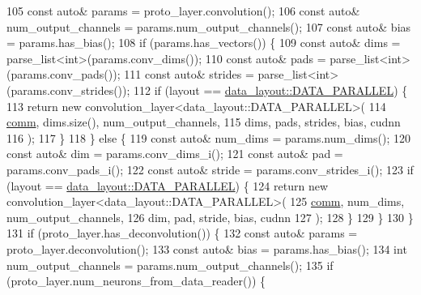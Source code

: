 \begin{DoxyCode}
105     \textcolor{keyword}{const} \textcolor{keyword}{auto}& params = proto\_layer.convolution();
106     \textcolor{keyword}{const} \textcolor{keyword}{auto}& num\_output\_channels = params.num\_output\_channels();
107     \textcolor{keyword}{const} \textcolor{keyword}{auto}& bias = params.has\_bias();
108     \textcolor{keywordflow}{if} (params.has\_vectors()) \{
109       \textcolor{keyword}{const} \textcolor{keyword}{auto}& dims = parse\_list<int>(params.conv\_dims());
110       \textcolor{keyword}{const} \textcolor{keyword}{auto}& pads = parse\_list<int>(params.conv\_pads());
111       \textcolor{keyword}{const} \textcolor{keyword}{auto}& strides = parse\_list<int>(params.conv\_strides());
112       \textcolor{keywordflow}{if} (layout == \hyperlink{base_8hpp_a786677cbfb3f5677b4d84f3056eb08dba37d2a3465f7cbf4ab60f4e79944d0638}{data\_layout::DATA\_PARALLEL}) \{
113         \textcolor{keywordflow}{return} \textcolor{keyword}{new} convolution\_layer<data\_layout::DATA\_PARALLEL>(
114                      \hyperlink{file__io_8cpp_ab048c6f9fcbcfaa57ce68b00263dbebe}{comm}, dims.size(), num\_output\_channels,
115                      dims, pads, strides, bias, cudnn
116                    );
117       \}
118     \} \textcolor{keywordflow}{else} \{
119       \textcolor{keyword}{const} \textcolor{keyword}{auto}& num\_dims = params.num\_dims();
120       \textcolor{keyword}{const} \textcolor{keyword}{auto}& dim = params.conv\_dims\_i();
121       \textcolor{keyword}{const} \textcolor{keyword}{auto}& pad = params.conv\_pads\_i();
122       \textcolor{keyword}{const} \textcolor{keyword}{auto}& stride = params.conv\_strides\_i();
123       \textcolor{keywordflow}{if} (layout == \hyperlink{base_8hpp_a786677cbfb3f5677b4d84f3056eb08dba37d2a3465f7cbf4ab60f4e79944d0638}{data\_layout::DATA\_PARALLEL}) \{
124         \textcolor{keywordflow}{return} \textcolor{keyword}{new} convolution\_layer<data\_layout::DATA\_PARALLEL>(
125                      \hyperlink{file__io_8cpp_ab048c6f9fcbcfaa57ce68b00263dbebe}{comm}, num\_dims, num\_output\_channels,
126                      dim, pad, stride, bias, cudnn
127                    );
128       \}
129     \}
130   \}
131   \textcolor{keywordflow}{if} (proto\_layer.has\_deconvolution()) \{
132     \textcolor{keyword}{const} \textcolor{keyword}{auto}& params = proto\_layer.deconvolution();
133     \textcolor{keyword}{const} \textcolor{keyword}{auto}& bias = params.has\_bias();
134     \textcolor{keywordtype}{int} num\_output\_channels = params.num\_output\_channels();
135     \textcolor{keywordflow}{if} (proto\_layer.num\_neurons\_from\_data\_reader()) \{

\end{DoxyCode}
